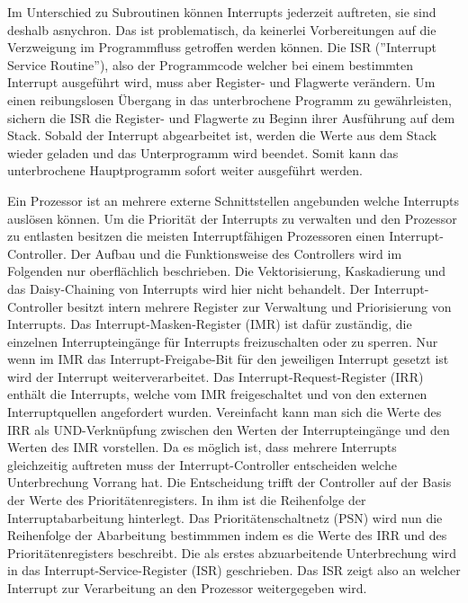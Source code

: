 \documentclass[12pt]{article}
\begin{document}
\noindent Im Unterschied zu Subroutinen können Interrupts jederzeit auftreten, sie sind deshalb asnychron. Das ist problematisch, da keinerlei Vorbereitungen auf die Verzweigung im Programmfluss getroffen werden können. Die ISR (''Interrupt Service Routine''), also der Programmcode welcher bei einem bestimmten Interrupt ausgeführt wird, muss aber Register- und Flagwerte verändern. Um einen reibungslosen Übergang in das unterbrochene Programm zu gewährleisten, sichern die ISR die Register- und Flagwerte zu Beginn ihrer Ausführung auf dem Stack. Sobald der Interrupt abgearbeitet ist, werden die Werte aus dem Stack wieder geladen und das Unterprogramm wird beendet. Somit kann das unterbrochene Hauptprogramm sofort weiter ausgeführt werden.
 
\noindent Ein Prozessor ist an mehrere externe Schnittstellen angebunden welche Interrupts auslösen können. Um die Priorität der Interrupts zu verwalten und den Prozessor zu entlasten besitzen die meisten Interruptfähigen Prozessoren einen Interrupt-Controller. Der Aufbau und die Funktionsweise des Controllers wird im Folgenden nur oberflächlich beschrieben. Die Vektorisierung, Kaskadierung und das Daisy-Chaining von Interrupts wird hier nicht behandelt.
Der Interrupt-Controller besitzt intern mehrere Register zur Verwaltung und Priorisierung von Interrupts. Das Interrupt-Masken-Register (IMR) ist dafür zuständig, die einzelnen Interrupteingänge für Interrupts freizuschalten oder zu sperren. Nur wenn im IMR das Interrupt-Freigabe-Bit für den jeweiligen Interrupt gesetzt ist wird der Interrupt weiterverarbeitet. Das Interrupt-Request-Register (IRR) enthält die Interrupts, welche vom IMR freigeschaltet  und von den externen Interruptquellen angefordert wurden. Vereinfacht kann man sich die Werte des IRR als UND-Verknüpfung zwischen den Werten der Interrupteingänge und den Werten des IMR vorstellen. Da es möglich ist, dass mehrere Interrupts gleichzeitig auftreten muss der Interrupt-Controller entscheiden welche Unterbrechung Vorrang hat. Die Entscheidung trifft der Controller auf der Basis der Werte des Prioritätenregisters. In ihm ist die Reihenfolge der Interruptabarbeitung hinterlegt. Das Prioritätenschaltnetz (PSN) wird nun die Reihenfolge der Abarbeitung bestimmmen indem es die Werte des IRR und des Prioritätenregisters beschreibt. Die als erstes abzuarbeitende Unterbrechung wird in das Interrupt-Service-Register (ISR) geschrieben. Das ISR zeigt also an welcher Interrupt zur Verarbeitung an den Prozessor weitergegeben wird. \cite{mikroprozessortechnik2011}
\end{document}
